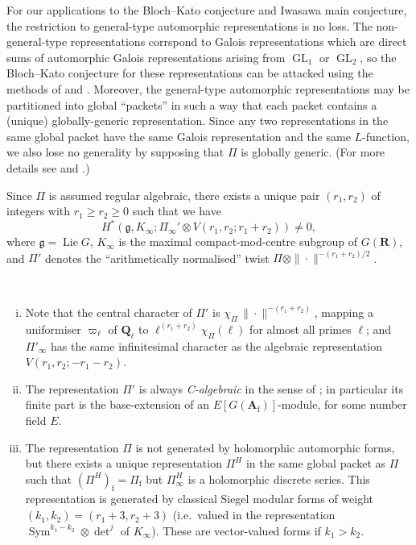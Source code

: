 \documentclass[cjm]{ipart}
\theoremstyle{plain}
\theoremstyle{remark}
\DeclareMathOperator{\GL}{GL}
\DeclareMathOperator{\Sym}{Sym}
\newcommand{\Af}{\AA_{\mathrm{f}}}
\newcommand{\Pif}{\Pi_{\mathrm{f}}}
\newcommand{\QQ}{\mathbf{Q}}
\renewcommand{\AA}{\mathbf{A}}
\numberwithin{equation}{subsection}
\renewcommand{\ge}{\geqslant}
\begin{document}
  \begin{remark}
   For our applications to the Bloch--Kato conjecture and Iwasawa main conjecture, the restriction to general-type automorphic representations is no loss. The non-general-type representations corrspond to Galois representations which are direct sums of automorphic Galois representations arising from $\GL_1$ or $\GL_2$, so the Bloch--Kato conjecture for these representations can be attacked using the methods of \cite{huberkings03} and \cite{kato04}. Moreover, the general-type automorphic representations may be partitioned into global ``packets'' in such a way that each packet contains a (unique) globally-generic representation. Since any two representations in the same global packet have the same Galois representation and the same $L$-function, we also lose no generality by supposing that $\Pi$ is globally generic. (For more details see \cite{arthur04} and \cite{geetaibi18}.)
  \end{remark}

  Since $\Pi$ is assumed regular algebraic, there exists a unique pair $(r_1, r_2)$ of integers with $r_1 \ge r_2 \ge 0$ such that we have
  \[ H^*( \mathfrak{g}, K_\infty; \Pi_\infty' \otimes V(r_1, r_2; r_1 + r_2) ) \ne 0, \]
  where $\mathfrak{g} = \operatorname{Lie} G$, $K_\infty$ is the maximal compact-mod-centre subgroup of $G(\mathbf{R})$, and $\Pi'$ denotes the ``arithmetically normalised'' twist $\Pi \otimes \|\cdot\|^{-(r_1 + r_2)/2}$.

  \begin{remark} \
   \begin{enumerate}[(i)]
    \item Note that the central character of $\Pi'$ is $\chi_{\Pi} \,\|\cdot\|^{-(r_1 + r_2)}$, mapping a uniformiser $\varpi_\ell$ of $\QQ_\ell$ to $\ell^{(r_1 + r_2)} \chi_{\Pi}(\ell)$ for almost all primes $\ell$; and $\Pi'_\infty$ has the same infinitesimal character as the algebraic representation $V(r_1, r_2; -r_1-r_2)$.

    \item The representation $\Pi'$ is always \emph{C-algebraic} in the sense of \cite{buzzardgee14}; in particular its finite part is the base-extension of an $E[G(\Af)]$-module, for some number field $E$.%

    \item The representation $\Pi$ is not generated by holomorphic automorphic forms, but there exists a unique representation $\Pi^H$ in the same global packet as $\Pi$ such that $(\Pi^H)_\mathrm{f} = \Pif$ but $\Pi^H_\infty$ is a holomorphic discrete series. This representation is generated by classical Siegel modular forms of weight $(k_1, k_2) = (r_1 + 3, r_2 + 3)$ (i.e.~valued in the representation $\Sym^{k_1 - k_2} \otimes \det^j$ of $K_\infty$). These are vector-valued forms if $k_1 > k_2$.\qedhere
   \end{enumerate}
  \end{remark}
\end{document}

